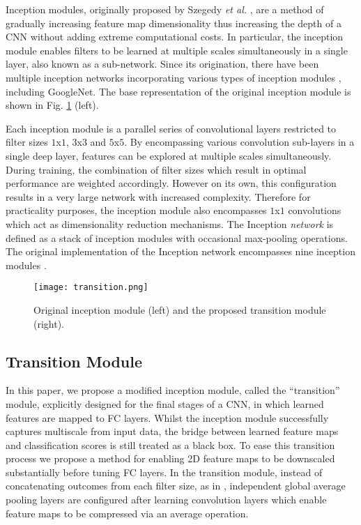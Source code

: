 \documentclass[runningheads,a4paper]{llncs}
\def\etal{\emph{et al. }}
\begin{document}
Inception modules, originally proposed by Szegedy \etal \cite{Szegedy2015}, are a method of gradually increasing feature map dimensionality thus increasing the depth of a CNN without adding extreme computational costs. In particular, the inception module enables filters to be learned at multiple scales simultaneously in a single layer, also known as a sub-network. Since its origination, there have been multiple inception networks incorporating various types of inception modules \cite{Szegedy2016,Szegedy2016b}, including GoogleNet. The base representation of the original inception module is shown in Fig. \ref{fig:compare} (left). 

Each inception module is a parallel series of convolutional layers restricted to filter sizes $1$x$1$, $3$x$3$ and $5$x$5$. By encompassing various convolution sub-layers in a single deep layer, features can be explored at multiple scales simultaneously. During training, the combination of filter sizes which result in optimal performance are weighted accordingly.
However on its own, this configuration results in a very large network with increased complexity. Therefore for practicality purposes, the inception module also encompasses $1$x$1$ convolutions which act as dimensionality reduction mechanisms. The Inception \emph{network} is defined as a stack of inception modules with occasional max-pooling operations. The original implementation of the Inception network encompasses nine inception modules \cite{Szegedy2015}.

\begin{figure}
	\centering
	\texttt{[image: transition.png]}
	\caption{Original inception module (left) and the proposed transition module (right).}
	\label{fig:compare}
\end{figure}

\subsection{Transition Module}

In this paper, we propose a modified inception module, called the ``transition'' module, explicitly designed for the final stages of a CNN, in which learned features are mapped to FC layers. Whilst the inception module successfully captures multiscale from input data, the bridge between learned feature maps and classification scores is still treated as a black box. To ease this transition process we propose a method for enabling 2D feature maps to be downscaled substantially before tuning FC layers.
In the transition module, instead of concatenating outcomes from each filter size, as in \cite{Szegedy2015}, independent global average pooling layers are configured after learning convolution layers which enable feature maps to be compressed via an average operation. 
\end{document}

